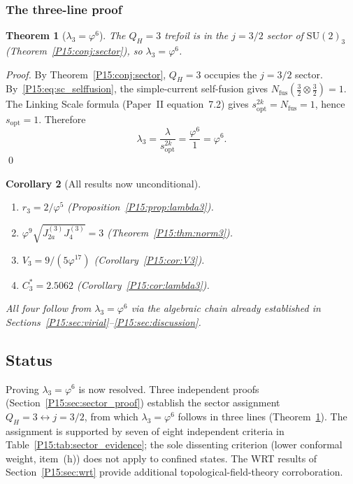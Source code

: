 \documentclass[11pt,a4paper]{article}
\newtheorem{theorem}{Theorem}[section]
\newtheorem{corollary}[theorem]{Corollary}
\theoremstyle{definition}\newtheorem{definition}[theorem]{Definition}
\theoremstyle{remark}
\newcommand{\vp}{\varphi}
\newcommand{\lam}{\lambda}
\newcommand{\Ja}{J_{2a}}
\newcommand{\Jfour}{J_4}
\newcommand{\QH}{Q_H}
\begin{document}
\subsubsection*{The three-line proof}

\begin{theorem}[$\lam_3=\vp^6$]
\label{P15:thm:lambda3_sc}
The $\QH=3$ trefoil is in the $j=3/2$ sector of $\mathrm{SU}(2)_3$
(Theorem~\ref{P15:conj:sector}), so $\lam_3 = \vp^6$.
\end{theorem}

\begin{proof}
By Theorem~\ref{P15:conj:sector}, $\QH=3$ occupies the $j=3/2$ sector.
By~\eqref{P15:eq:sc_selffusion}, the simple-current self-fusion gives
$N_{\mathrm{fus}}(\tfrac{3}{2}\otimes\tfrac{3}{2})=1$.
The Linking Scale formula (Paper~II equation~7.2) gives
$s_{\mathrm{opt}}^{2k} = N_{\mathrm{fus}} = 1$, hence $s_{\mathrm{opt}}=1$.
Therefore
\begin{equation}
  \boxed{\lam_3 = \frac{\lam}{s_{\mathrm{opt}}^{2k}} = \frac{\vp^6}{1} = \vp^6.}
  \label{P15:eq:lambda3_proved}
\end{equation}
\vspace{-1em}\qed
\end{proof}

\begin{corollary}[All results now unconditional]
\label{P15:cor:sc_consequences}
\begin{enumerate}[noitemsep,label=\textup{(\roman*)}]
\item $r_3 = 2/\vp^5$ (Proposition~\ref{P15:prop:lambda3}).
\item $\vp^9\sqrt{\Ja^{(3)}\Jfour^{(3)}}=3$ (Theorem~\ref{P15:thm:norm3}).
\item $V_3 = 9/(5\vp^{17})$ (Corollary~\ref{P15:cor:V3}).
\item $C_3^* = 2.5062$ (Corollary~\ref{P15:cor:lambda3}).
\end{enumerate}
All four follow from $\lam_3=\vp^6$ via the algebraic chain already
established in Sections~\ref{P15:sec:virial}--\ref{P15:sec:discussion}.
\end{corollary}

\subsection{Status}
\label{P15:sec:lam_status}

Proving $\lam_3=\vp^6$ is now resolved.
Three independent proofs (Section~\ref{P15:sec:sector_proof}) establish
the sector assignment $\QH=3\leftrightarrow j=3/2$, from which
$\lam_3=\vp^6$ follows in three lines (Theorem~\ref{P15:thm:lambda3_sc}).
The assignment is supported by seven of eight independent criteria
in Table~\ref{P15:tab:sector_evidence}; the sole dissenting criterion
(lower conformal weight, item~(h)) does not apply to confined states.
The WRT results of Section~\ref{P15:sec:wrt} provide additional
topological-field-theory corroboration.
\end{document}
